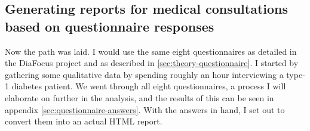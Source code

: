 \subsection{Generating reports for medical consultations based on questionnaire responses}
Now the path was laid. I would use the same eight questionnaires as detailed in the DiaFocus project and as described in \autoref{sec:theory-questionnaire}. I started by gathering some qualitative data by spending roughly an hour interviewing a type-1 diabetes patient. We went through all eight questionnaires, a process I will elaborate on further in the analysis, and the results of this can be seen in appendix \autoref{sec:questionnaire-answers}. With the answers in hand, I set out to convert them into an actual HTML report.


